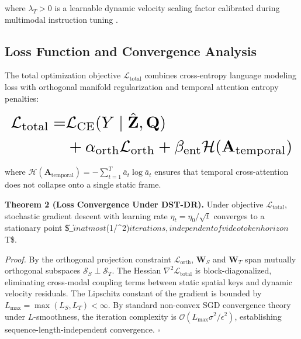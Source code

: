 \documentclass[10pt,journal,compsoc,twocolumn]{IEEEtran}
\begin{document}
where $\lambda_T > 0$ is a learnable dynamic velocity scaling factor calibrated during multimodal instruction tuning \cite{arxiv_2305_18290}.




\subsection{Loss Function and Convergence Analysis}


The total optimization objective $\mathcal{L}_{\text{total}}$ combines cross-entropy language modeling loss with orthogonal manifold regularization and temporal attention entropy penalties:

















\begin{equation}
\resizebox{\columnwidth}{!}{$\displaystyle
\begin{aligned}
\mathcal{L}_{\text{total}} = & \mathcal{L}_{\text{CE}}(Y \mid \hat{\mathbf{Z}}, \mathbf{Q}) \\
& + \alpha_{\text{orth}} \mathcal{L}_{\text{orth}} + \beta_{\text{ent}} \mathcal{H}(\mathbf{A}_{\text{temporal}})
\end{aligned}
$}
\end{equation}

















where $\mathcal{H}(\mathbf{A}_{\text{temporal}}) = -\sum_{t=1}^T \bar{a}_t \log \bar{a}_t$ ensures that temporal cross-attention does not collapse onto a single static frame.

\textbf{Theorem 2 (Loss Convergence Under DST-DR).} Under objective $\mathcal{L}_{\text{total}}$, stochastic gradient descent with learning rate $\eta_t = \eta_0 / \sqrt{t}$ converges to a stationary point \$\|\nabla {}\_{}\| \le \epsilon$ in at most $(1/\epsilon^2)$ iterations, independent of video token horizon $T\$.

\textit{Proof.} By the orthogonal projection constraint $\mathcal{L}_{\text{orth}}$, $\mathbf{W}_S$ and $\mathbf{W}_T$ span mutually orthogonal subspaces $\mathcal{S}_S \perp \mathcal{S}_T$. The Hessian $\nabla^2 \mathcal{L}_{\text{total}}$ is block-diagonalized, eliminating cross-modal coupling terms between static spatial keys and dynamic velocity residuals. The Lipschitz constant of the gradient is bounded by $L_{\max} = \max(L_S, L_T) < \infty$. By standard non-convex SGD convergence theory under $L$-smoothness, the iteration complexity is $\mathcal{O}(L_{\max} \sigma^2 / \epsilon^2)$, establishing sequence-length-independent convergence. $\square$
\end{document}
